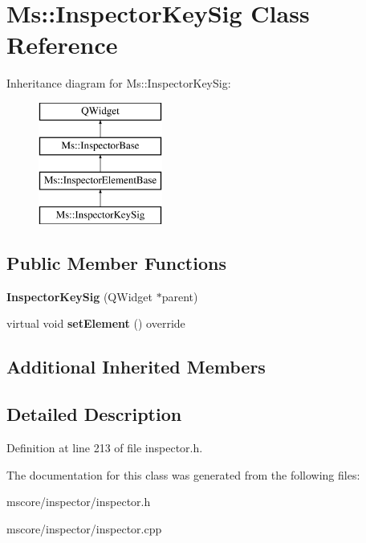 \hypertarget{class_ms_1_1_inspector_key_sig}{}\section{Ms\+:\+:Inspector\+Key\+Sig Class Reference}
\label{class_ms_1_1_inspector_key_sig}
Inheritance diagram for Ms\+:\+:Inspector\+Key\+Sig\+:\begin{figure}[H]
\begin{center}
\leavevmode
\includegraphics[height=4.000000cm]{class_ms_1_1_inspector_key_sig}
\end{center}
\end{figure}
\subsection*{Public Member Functions}
\begin{DoxyCompactItemize}
\item 
\mbox{\label{class_ms_1_1_inspector_key_sig_ac534b76967f354c601f6e7bb802d0ba6}} 
{\bfseries Inspector\+Key\+Sig} (Q\+Widget $\ast$parent)
\item 
\mbox{\label{class_ms_1_1_inspector_key_sig_adedbbf92b8102173bc2ecb98c8bf9891}} 
virtual void {\bfseries set\+Element} () override
\end{DoxyCompactItemize}
\subsection*{Additional Inherited Members}


\subsection{Detailed Description}


Definition at line 213 of file inspector.\+h.



The documentation for this class was generated from the following files\+:\begin{DoxyCompactItemize}
\item 
mscore/inspector/inspector.\+h\item 
mscore/inspector/inspector.\+cpp\end{DoxyCompactItemize}
